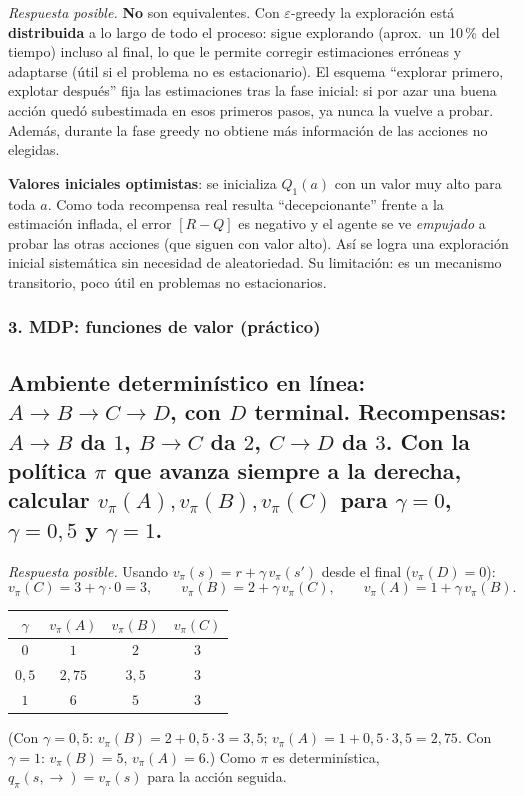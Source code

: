 \documentclass[11pt, a4paper]{article}
\newcommand{\pregunta}[1]{\subsection{#1}}
\newcommand{\eje}[1]{\subsubsection{#1}}
\begin{document}
\begin{respuesta}
\textit{Respuesta posible.} \textbf{No} son equivalentes. Con $\varepsilon$-greedy la exploraci\'on est\'a \textbf{distribuida} a lo largo de todo el proceso: sigue explorando (aprox.\ un 10\,\% del tiempo) incluso al final, lo que le permite corregir estimaciones err\'oneas y adaptarse (\'util si el problema no es estacionario). El esquema ``explorar primero, explotar despu\'es'' fija las estimaciones tras la fase inicial: si por azar una buena acci\'on qued\'o subestimada en esos primeros pasos, ya nunca la vuelve a probar. Adem\'as, durante la fase greedy no obtiene m\'as informaci\'on de las acciones no elegidas.

\textbf{Valores iniciales optimistas}: se inicializa $Q_1(a)$ con un valor muy alto para toda $a$. Como toda recompensa real resulta ``decepcionante'' frente a la estimaci\'on inflada, el error $[R-Q]$ es negativo y el agente se ve \emph{empujado} a probar las otras acciones (que siguen con valor alto). As\'i se logra una exploraci\'on inicial sistem\'atica sin necesidad de aleatoriedad. Su limitaci\'on: es un mecanismo transitorio, poco \'util en problemas no estacionarios.
\end{respuesta}

\eje{3. MDP: funciones de valor (pr\'actico)}
\pregunta{Ambiente determin\'istico en l\'inea: $A \to B \to C \to D$, con $D$ terminal. Recompensas: $A\to B$ da $1$, $B\to C$ da $2$, $C\to D$ da $3$. Con la pol\'itica $\pi$ que avanza siempre a la derecha, calcular $v_\pi(A), v_\pi(B), v_\pi(C)$ para $\gamma = 0$, $\gamma = 0{,}5$ y $\gamma = 1$.}

\begin{respuesta}
\textit{Respuesta posible.} Usando $v_\pi(s) = r + \gamma\, v_\pi(s')$ desde el final ($v_\pi(D)=0$):
\[
v_\pi(C)=3+\gamma\cdot 0=3,\qquad v_\pi(B)=2+\gamma\, v_\pi(C),\qquad v_\pi(A)=1+\gamma\, v_\pi(B).
\]
\begin{center}
\begin{tabular}{c c c c}
\toprule
$\gamma$ & $v_\pi(A)$ & $v_\pi(B)$ & $v_\pi(C)$ \\
\midrule
$0$   & $1$    & $2$   & $3$ \\
$0{,}5$ & $2{,}75$ & $3{,}5$ & $3$ \\
$1$   & $6$    & $5$   & $3$ \\
\bottomrule
\end{tabular}
\end{center}
(Con $\gamma=0{,}5$: $v_\pi(B)=2+0{,}5\cdot3=3{,}5$; $v_\pi(A)=1+0{,}5\cdot3{,}5=2{,}75$.
Con $\gamma=1$: $v_\pi(B)=5$, $v_\pi(A)=6$.) Como $\pi$ es determin\'istica, $q_\pi(s,\rightarrow)=v_\pi(s)$ para la acci\'on seguida.
\end{respuesta}
\end{document}
